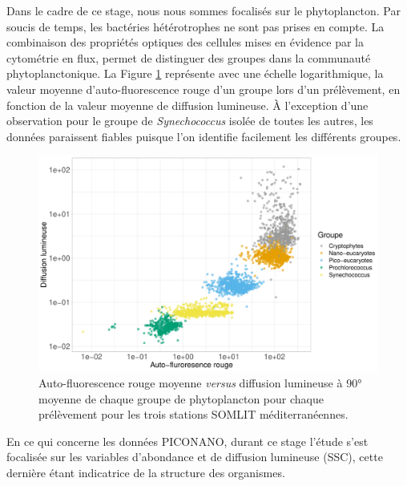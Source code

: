 \documentclass[12pt]{article}
\begin{document}
Dans le cadre de ce stage, nous nous sommes focalisés sur le phytoplancton. Par soucis de temps, les bactéries hétérotrophes ne sont pas prises en compte. 
La combinaison des propriétés optiques des cellules mises en évidence par la cytométrie en flux, permet de distinguer des groupes dans la communauté phytoplanctonique. %
La Figure \ref{vis_cyto} représente avec une échelle logarithmique, la valeur moyenne d’auto-fluorescence rouge d’un groupe lors d’un prélèvement, en fonction de la valeur moyenne de diffusion lumineuse. À l’exception d’une observation pour le groupe de \textit{Synechococcus} isolée de toutes les autres, les données paraissent fiables puisque l'on identifie facilement les différents groupes. 

\begin{figure}
\centering
\includegraphics[width=.75\textwidth]{fig/MM_visualisation_phyto.pdf}
\caption{Auto-fluorescence rouge moyenne \textit{versus} diffusion lumineuse à 90° moyenne de chaque groupe de phytoplancton pour chaque prélèvement pour les trois stations SOMLIT méditerranéennes. }
\label{vis_cyto}
\end{figure}

En ce qui concerne les données PICONANO, %
durant ce stage l’étude s'est focalisée sur les variables d’abondance et de diffusion lumineuse (SSC), cette dernière étant indicatrice de la structure des organismes. 
\end{document}
